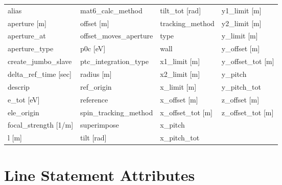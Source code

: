  \begin{tabular}{llll} \toprule
alias                            & mat6_calc_method                 & tilt_tot [rad]                   & y1_limit [m]                     \\
aperture [m]                     & offset [m]                       & tracking_method                  & y2_limit [m]                     \\
aperture_at                      & offset_moves_aperture            & type                             & y_limit [m]                      \\
aperture_type                    & p0c [eV]                         & wall                             & y_offset [m]                     \\
create_jumbo_slave               & ptc_integration_type             & x1_limit [m]                     & y_offset_tot [m]                 \\
delta_ref_time [sec]             & radius [m]                       & x2_limit [m]                     & y_pitch                          \\
descrip                          & ref_origin                       & x_limit [m]                      & y_pitch_tot                      \\
e_tot [eV]                       & reference                        & x_offset [m]                     & z_offset [m]                     \\
ele_origin                       & spin_tracking_method             & x_offset_tot [m]                 & z_offset_tot [m]                 \\
focal_strength [1/m]             & superimpose                      & x_pitch                          &                                  \\
l [m]                            & tilt [rad]                       & x_pitch_tot                      &                                  \\
 \bottomrule
 \end{tabular}
 \vfill
 
 \section{Line Statement Attributes}
 \label{s:list.line}
 
